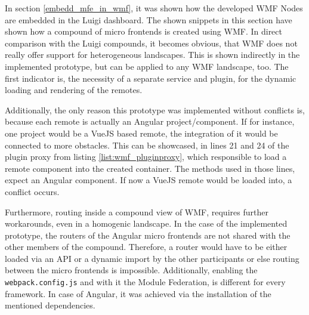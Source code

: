 In section \ref{embedd_mfe_in_wmf}, it was shown how the developed WMF Nodes are embedded in the Luigi dashboard. The shown snippets in this section have shown how a compound of micro frontends is created using WMF. In direct comparison with the Luigi compounds, it becomes obvious, that WMF does not really offer support for heterogeneous landscapes. This is shown indirectly in the implemented prototype, but can be applied to any WMF landscape, too. 
The first indicator is, the necessity of a separate service and plugin, for the dynamic loading and rendering of the remotes.

Additionally, the only reason this prototype was implemented without conflicts is, because each remote is actually an Angular project/component. If for instance, one project would be a VueJS based remote, the integration of it would be connected to more obstacles. This can be showcased, in lines 21 and 24 of the plugin proxy from listing \ref{list:wmf_pluginproxy}, which responsible to load a remote component into the created container. The methods used in those lines, expect an Angular component. If now a VueJS remote would be loaded into, a conflict occurs.

Furthermore, routing inside a compound view of WMF, requires further workarounds, even in a homogenic landscape. In the case of the implemented prototype, the routers of the Angular micro frontends are not shared with the other members of the compound. Therefore, a router would have to be either loaded via an API or a dynamic import by the other participants or else routing between the micro frontends is impossible.
Additionally, enabling the \texttt{webpack.config.js} and with it the Module Federation, is different for every framework. In case of Angular, it was achieved via the installation of the mentioned dependencies.
